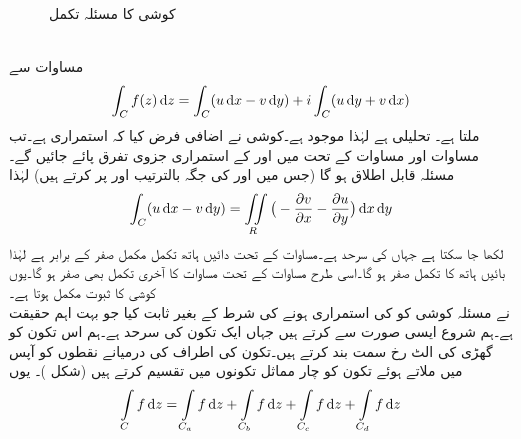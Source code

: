 \begin{figure}
\centering
{}
\caption{کوشی کا مسئلہ تکمل}
\label{شکل_مخلوط_تکمل_مسئلہ_کوشی_دائرہ_کار}
\end{figure}
\quad {}\\
مساوات  سے 
\begin{align}\label{مساوت_مخلوط_تکمل_کوشی_تکمل_ثبوت_الف}
\int_C f(z)\dif z=\int_C(u\dif x-v\dif y)+i\int_C(u\dif y+v\dif x)
\end{align}
ملتا ہے۔  تحلیلی ہے لہٰذا  موجود ہے۔کوشی نے اضافی فرض کیا کہ  استمراری ہے۔تب مساوات  اور مساوات   کے تحت  میں  اور  کے استمراری جزوی تفرق پائے جائیں گے۔مسئلہ  قابل اطلاق ہو گا (جس میں  اور  کی جگہ بالترتیب  اور  پر کرتے ہیں) لہٰذا
\begin{align*}
\int_C (u\dif x-v\dif y)=\iint\limits_R \big(-\frac{\partial v}{\partial x}-\frac{\partial u}{\partial y}\big)\dif x\dif y
\end{align*}
لکھا جا سکتا ہے جہاں  کی سرحد  ہے۔مساوات  کے تحت دائیں ہاتھ تکمل مکمل صفر کے برابر ہے لہٰذا بائیں ہاتھ کا تکمل صفر ہو گا۔اسی طرح  مساوات  کے تحت مساوات  کا آخری تکمل بھی صفر ہو گا۔یوں کوشی کا ثبوت مکمل ہوتا ہے۔
\quad {}\\
 نے مسئلہ کوشی کو  کی استمراری ہونے کی شرط کے بغیر ثابت کیا جو بہت اہم حقیقت ہے۔ہم شروع ایسی صورت سے کرتے ہیں جہاں  ایک تکون کی سرحد ہے۔ہم اس تکون کو گھڑی کی الٹ رخ سمت بند کرتے ہیں۔تکون کی اطراف کی درمیانے نقطوں کو آپس میں ملاتے ہوئے تکون کو چار مماثل تکونوں میں تقسیم کرتے ہیں (شکل )۔ یوں 
\begin{align*}
\int\limits_{C}f\dif z=\int\limits_{C_a}f\dif z+\int\limits_{C_b}f\dif z+\int\limits_{C_c}f\dif z+\int\limits_{C_d}f\dif z
\end{align*}
